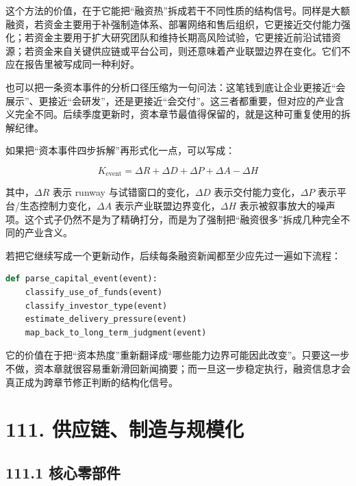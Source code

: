 这个方法的价值，在于它能把“融资热”拆成若干不同性质的结构信号。同样是大额融资，若资金主要用于补强制造体系、部署网络和售后组织，它更接近交付能力强化；若资金主要用于扩大研究团队和维持长期高风险试验，它更接近前沿试错资源；若资金来自关键供应链或平台公司，则还意味着产业联盟边界在变化。它们不应在报告里被写成同一种利好。

也可以把一条资本事件的分析口径压缩为一句问法：这笔钱到底让企业更接近“会展示”、更接近“会研发”，还是更接近“会交付”。这三者都重要，但对应的产业含义完全不同。后续季度更新时，资本章节最值得保留的，就是这种可重复使用的拆解纪律。

如果把“资本事件四步拆解”再形式化一点，可以写成：

\begingroup
\footnotesize
\begin{equation*}
K_{\text{event}} = \Delta R + \Delta D + \Delta P + \Delta A - \Delta H
\end{equation*}
\endgroup

其中，\(\Delta R\) 表示 runway 与试错窗口的变化，\(\Delta D\) 表示交付能力变化，\(\Delta P\) 表示平台/生态控制力变化，\(\Delta A\) 表示产业联盟边界变化，\(\Delta H\) 表示被叙事放大的噪声项。这个式子仍然不是为了精确打分，而是为了强制把“融资很多”拆成几种完全不同的产业含义。

若把它继续写成一个更新动作，后续每条融资新闻都至少应先过一遍如下流程：

\begin{lstlisting}[language=python]
def parse_capital_event(event):
    classify_use_of_funds(event)
    classify_investor_type(event)
    estimate_delivery_pressure(event)
    map_back_to_long_term_judgment(event)
\end{lstlisting}

它的价值在于把“资本热度”重新翻译成“哪些能力边界可能因此改变”。只要这一步不做，资本章就很容易重新滑回新闻摘要；而一旦这一步稳定执行，融资信息才会真正成为跨章节修正判断的结构化信号。

\chapter*{111. 供应链、制造与规模化}

\section*{111.1 核心零部件}


